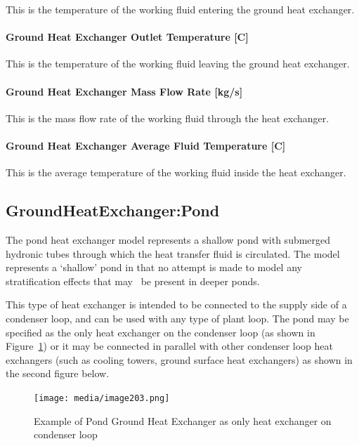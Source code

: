 This is the temperature of the working fluid entering the ground heat exchanger.

\paragraph{Ground Heat Exchanger Outlet Temperature {[}C{]}}\label{ground-heat-exchanger-outlet-temperature-c-1}

This is the temperature of the working fluid leaving the ground heat exchanger.

\paragraph{Ground Heat Exchanger Mass Flow Rate {[}kg/s{]}}\label{ground-heat-exchanger-mass-flow-rate-kgs-1}

This is the mass flow rate of the working fluid through the heat exchanger.

\paragraph{Ground Heat Exchanger Average Fluid Temperature {[}C{]}}\label{ground-heat-exchanger-average-fluid-temperature-c-1}

This is the average temperature of the working fluid inside the heat exchanger.

\subsection{GroundHeatExchanger:Pond}\label{groundheatexchangerpond}

The pond heat exchanger model represents a shallow pond with submerged hydronic tubes through which the heat transfer fluid is circulated. The model represents a `shallow' pond in that no attempt is made to model any stratification effects that may~ be present in deeper ponds.

This type of heat exchanger is intended to be connected to the supply side of a condenser loop, and can be used with any type of plant loop. The pond may be specified as the only heat exchanger on the condenser loop (as shown in Figure~\ref{fig:example-of-pond-ground-heat-exchanger-as-only}) or it may be connected in parallel with other condenser loop heat exchangers (such as cooling towers, ground surface heat exchangers) as shown in the second figure below.

\begin{figure}[hbtp] %
\centering
\texttt{[image: media/image203.png]}
\caption{Example of Pond Ground Heat Exchanger as only heat exchanger on condenser loop \protect \label{fig:example-of-pond-ground-heat-exchanger-as-only}}
\end{figure}

